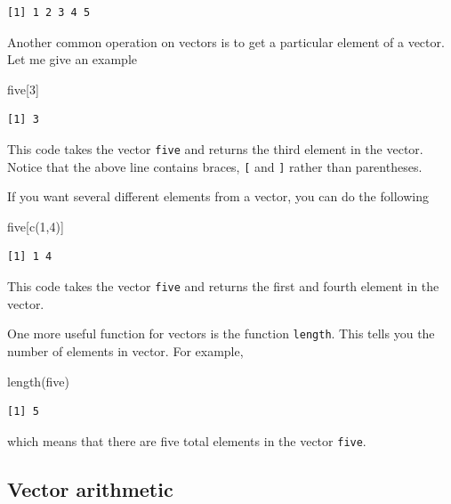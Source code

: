 \documentclass[
  letterpaper,
  DIV=11,
  numbers=noendperiod]{scrreprt}
\newenvironment{Shaded}{\begin{snugshade}}{\end{snugshade}}
\newcommand{\DecValTok}[1]{\textcolor[rgb]{0.68,0.00,0.00}{#1}}
\newcommand{\FunctionTok}[1]{\textcolor[rgb]{0.28,0.35,0.67}{#1}}
\newcommand{\NormalTok}[1]{\textcolor[rgb]{0.00,0.23,0.31}{#1}}
\begin{document}
\begin{verbatim}
[1] 1 2 3 4 5
\end{verbatim}

Another common operation on vectors is to get a particular element of a
vector. Let me give an example

\begin{Shaded}
\begin{Highlighting}[]
\NormalTok{five[}\DecValTok{3}\NormalTok{]}
\end{Highlighting}
\end{Shaded}

\begin{verbatim}
[1] 3
\end{verbatim}

This code takes the vector \texttt{five} and returns the third element
in the vector. Notice that the above line contains braces, \texttt{{[}}
and \texttt{{]}} rather than parentheses.

If you want several different elements from a vector, you can do the
following

\begin{Shaded}
\begin{Highlighting}[]
\NormalTok{five[}\FunctionTok{c}\NormalTok{(}\DecValTok{1}\NormalTok{,}\DecValTok{4}\NormalTok{)]}
\end{Highlighting}
\end{Shaded}

\begin{verbatim}
[1] 1 4
\end{verbatim}

This code takes the vector \texttt{five} and returns the first and
fourth element in the vector.

One more useful function for vectors is the function \texttt{length}.
This tells you the number of elements in vector. For example,

\begin{Shaded}
\begin{Highlighting}[]
\FunctionTok{length}\NormalTok{(five)}
\end{Highlighting}
\end{Shaded}

\begin{verbatim}
[1] 5
\end{verbatim}

which means that there are five total elements in the vector
\texttt{five}.

\subsection{Vector arithmetic}\label{vector-arithmetic}
\end{document}

